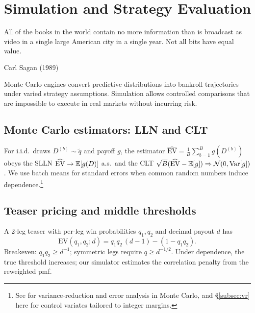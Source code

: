 \chapter{Simulation and Strategy Evaluation}
\label{chap:sim}

\epigraph{All of the books in the world contain no more information than is
broadcast as video in a single large American city in a single year. Not all
bits have equal value.}{Carl Sagan (1989)}


Monte Carlo engines convert predictive distributions into bankroll trajectories under varied strategy assumptions. Simulation allows controlled comparisons that are impossible to execute in real markets without incurring risk.

\section{Monte Carlo estimators: LLN and CLT}\label{sec:mc-lln}
For i.i.d.\ draws $D^{(b)}\sim \tilde q$ and payoff $g$, the estimator
$\widehat{\mathrm{EV}}=\tfrac1B\sum_{b=1}^B g(D^{(b)})$ obeys the SLLN
$\widehat{\mathrm{EV}}\to \mathbb{E}[g(D)]$ a.s.\ and the CLT
$\sqrt{B}(\widehat{\mathrm{EV}}-\mathbb{E}[g])\Rightarrow \mathcal{N}(0,\mathrm{Var}[g])$.
We use batch means for standard errors when common random numbers induce dependence.\footnote{See \citet{glasserman2003} for variance-reduction and error analysis in Monte Carlo, and \S\ref{subsec:vr} here for control variates tailored to integer margins.}

\section{Teaser pricing and middle thresholds}\label{sec:teaser-math}
A 2-leg teaser with per-leg win probabilities $q_1,q_2$ and decimal payout $d$ has
\begin{equation}\label{eq:teaser-ev}
\mathrm{EV}(q_1,q_2;d)=q_1q_2\,(d-1)-(1-q_1q_2).
\end{equation}
Breakeven: $q_1q_2\ge d^{-1}$; symmetric legs require $q\ge d^{-1/2}$. Under dependence, the
true threshold increases; our simulator estimates the correlation penalty from the reweighted pmf.


